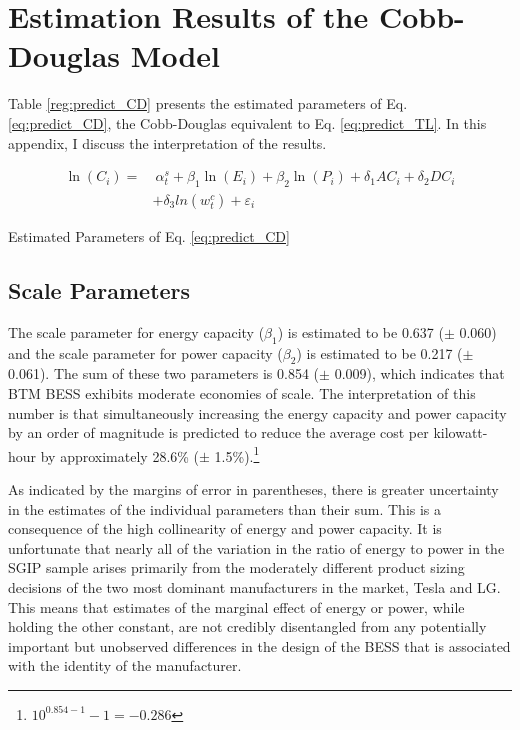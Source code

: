 \section{Estimation Results of the Cobb-Douglas Model}\label{apdx:cobb_douglas}

Table \ref{reg:predict_CD} presents the estimated parameters of Eq. \ref{eq:predict_CD}, the Cobb-Douglas equivalent to Eq. \ref{eq:predict_TL}. In this appendix, I discuss the interpretation of the results.

\begin{align}
    \ln(C_i) = &~\alpha^{s}_{t} + \beta_1 \ln(E_i) + \beta_2 \ln(P_i) + \delta_1 AC_i + \delta_2 DC_i  \label{eq:predict_CD} \\
		 & + \delta_3 ln(w^{c}_{t}) + \varepsilon_i \nonumber
\end{align}

\begin{table}[t]
\centering

\caption{Estimated Parameters of Eq. \ref{eq:predict_CD}}\label{reg:predict_CD}
\end{table}

\subsection{Scale Parameters}\label{apdx:scale_CD}

The scale parameter for energy capacity ($\beta_1$) is estimated to be 0.637 ($\pm$ 0.060) and the scale parameter for power capacity ($\beta_2$) is estimated to be 0.217 ($\pm$ 0.061). The sum of these two parameters is 0.854 ($\pm$ 0.009), which indicates that BTM BESS exhibits moderate economies of scale. The interpretation of this number is that simultaneously increasing the energy capacity and power capacity by an order of magnitude is predicted to reduce the average cost per kilowatt-hour by approximately 28.6\% ($\pm$ 1.5\%).\footnote{$10^{0.854-1}-1=-0.286$}

As indicated by the margins of error in parentheses, there is greater uncertainty in the estimates of the individual parameters than their sum. This is a consequence of the high collinearity of energy and power capacity. It is unfortunate that nearly all of the variation in the ratio of energy to power in the SGIP sample arises primarily from the moderately different product sizing decisions of the two most dominant manufacturers in the market, Tesla and LG. This means that estimates of the marginal effect of energy or power, while holding the other constant, are not credibly disentangled from any potentially important but unobserved differences in the design of the BESS that is associated with the identity of the manufacturer.


